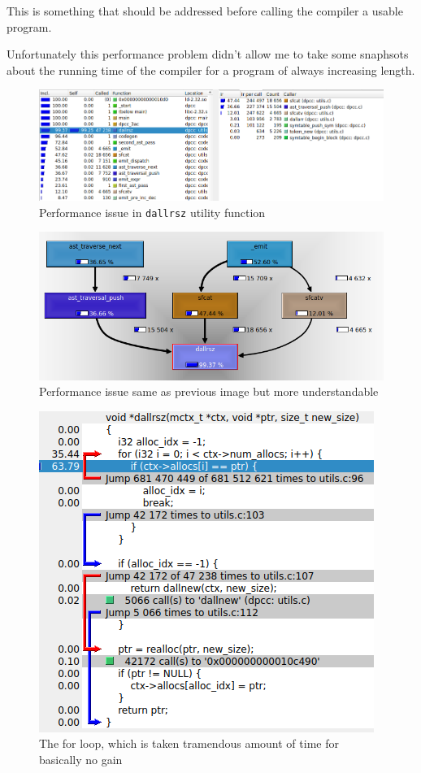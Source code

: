 \documentclass[a4paper]{article}
\begin{document}
This is something that should be addressed before calling the compiler a usable program.

Unfortunately this performance problem didn't allow me to take some snaphsots about the running time of the compiler
for a program of always increasing length.

\begin{figure}[H]
    \centering
    \includegraphics[width=\linewidth]{imgs/dallrsz_performance_issue.png}
    \caption{Performance issue in \texttt{dallrsz} utility function}
\end{figure}


\begin{figure}[H]
    \centering
    \includegraphics[scale=0.85]{imgs/dallrsz_callgraph.png}
    \caption{Performance issue same as previous image but more understandable}
\end{figure}


\begin{figure}[H]
    \centering
    \includegraphics{imgs/dallrsz_code_usage.png}
    \caption{The for loop, which is taken tramendous amount of time for basically no gain}
\end{figure}
\end{document}
